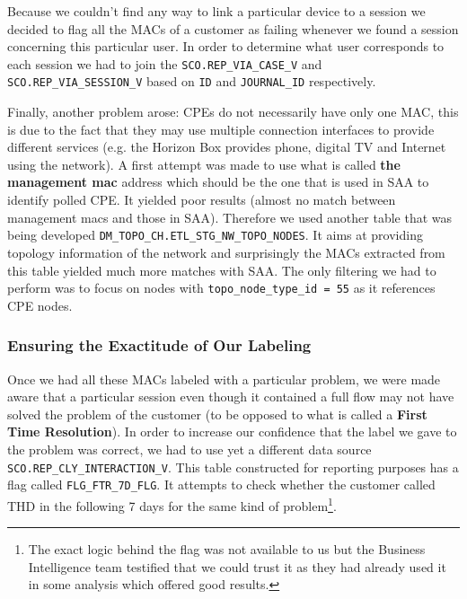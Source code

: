 Because we couldn't find any way to link a particular device to a session we decided to flag all the MACs of a customer as failing whenever we found a session concerning this particular user. In order to determine what user corresponds to each session we had to join the \texttt{SCO.REP\_VIA\_CASE\_V} and \texttt{SCO.REP\_VIA\_SESSION\_V} based on \texttt{ID} and \texttt{JOURNAL\_ID} respectively. 

Finally, another problem arose: CPEs do not necessarily have only one MAC, this is due to the fact that they may use multiple connection interfaces to provide different services (e.g. the Horizon Box provides phone, digital TV and Internet using the network). A first attempt was made to use what is called \textbf{the management mac} address which should be the one that is used in SAA to identify polled CPE. It yielded poor results (almost no match between management macs and those in SAA). Therefore we used another table that was being developed \texttt{DM\_TOPO\_CH.ETL\_STG\_NW\_TOPO\_NODES}. It aims at providing topology information of the network and surprisingly the MACs extracted from this table yielded much more matches with SAA. The only filtering we had to perform was to focus on nodes with \texttt{topo\_node\_type\_id = 55} as it references CPE nodes. 

\subsubsection{Ensuring the Exactitude of Our Labeling}
Once we had all these MACs labeled with a particular problem, we were made aware that a particular session even though it contained a full flow may not have solved the problem of the customer (to be opposed to what is called a \textbf{First Time Resolution}). In order to increase our confidence that the label we gave to the problem  was correct, we had to use yet a different data source \texttt{SCO.REP\_CLY\_INTERACTION\_V}. This table constructed for reporting purposes has a flag called \texttt{FLG\_FTR\_7D\_FLG}. It attempts to check whether the customer called THD in the following 7 days for the same kind of problem\footnote{The exact logic behind the flag was not available to us but the Business Intelligence team testified that we could trust it as they had already used it in some analysis which offered good results.}. 

